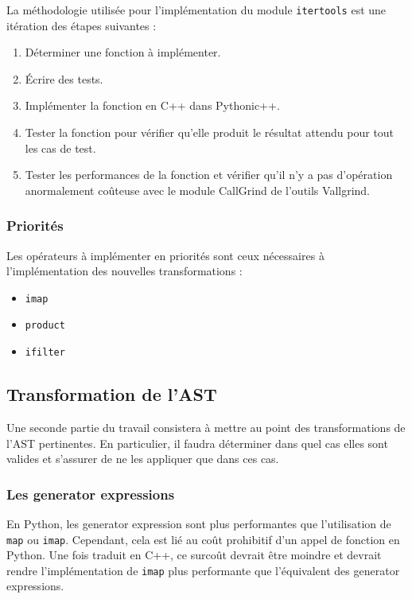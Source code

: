 \documentclass[a4paper]{article}
\begin{document}
La méthodologie utilisée pour l'implémentation du module \texttt{itertools} est
une itération des étapes suivantes :

\begin{enumerate}
\item Déterminer une fonction à implémenter.
\item Écrire des tests.
\item Implémenter la fonction en C++ dans Pythonic++.
\item Tester la fonction pour vérifier qu'elle produit le résultat
  attendu pour tout les cas de test.
  \item Tester les performances de la fonction et vérifier qu'il n'y a
    pas d'opération anormalement coûteuse avec le module CallGrind de
    l'outils Vallgrind.
\end{enumerate}

\subsubsection{Priorités}

Les opérateurs à implémenter en priorités sont ceux nécessaires à
l'implémentation des nouvelles transformations :

\begin{itemize}
  \item \texttt{imap}
  \item \texttt{product}
  \item \texttt{ifilter}
\end{itemize}


\subsection{Transformation de l'AST}

Une seconde partie du travail consistera à mettre au point des
transformations de l'AST pertinentes. En particulier, il faudra
déterminer dans quel cas elles sont valides et s'assurer de ne les
appliquer que dans ces cas.

\subsubsection{Les generator expressions}

En Python, les generator expression sont plus performantes que
l'utilisation de \texttt{map} ou \texttt{imap}. Cependant, cela est lié au coût
prohibitif d'un appel de fonction en Python. Une fois traduit en C++,
ce surcoût devrait être moindre et devrait rendre l'implémentation de
\texttt{imap} plus performante que l'équivalent des generator expressions.
\end{document}
